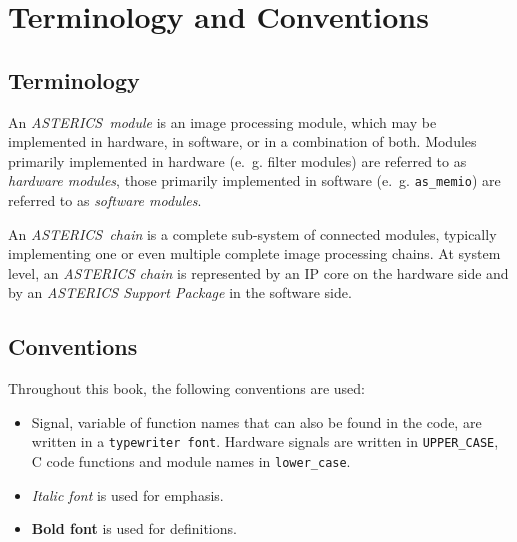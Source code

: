 \section{Terminology and Conventions}


\subsection{Terminology}

An \textit{ASTERICS~module} is an image processing module, which may be implemented in hardware, in software, or in a combination of both. Modules primarily implemented in hardware (e.~g. filter modules) are referred to as \textit{hardware modules}, those primarily implemented in software (e.~g. \texttt{as\_memio}) are referred to as \textit{software modules}.

An \textit{ASTERICS~chain} is a complete sub-system of connected \asterics modules, typically implementing one or even multiple complete image processing chains. At system level, an \textit{ASTERICS chain} is represented by an IP core on the hardware side and by an \textit{ASTERICS Support Package} in the software side.



\subsection{Conventions}

Throughout this book, the following conventions are used:

\begin{itemize}

\item Signal, variable of function names that can also be found in the code, are written in a \texttt{typewriter font}. Hardware signals are written in \texttt{UPPER\_CASE}, C code functions and module names in \texttt{lower\_case}.

\item \textit{Italic font} is used for emphasis.

\item \textbf{Bold font} is used for definitions.



\end{itemize}
